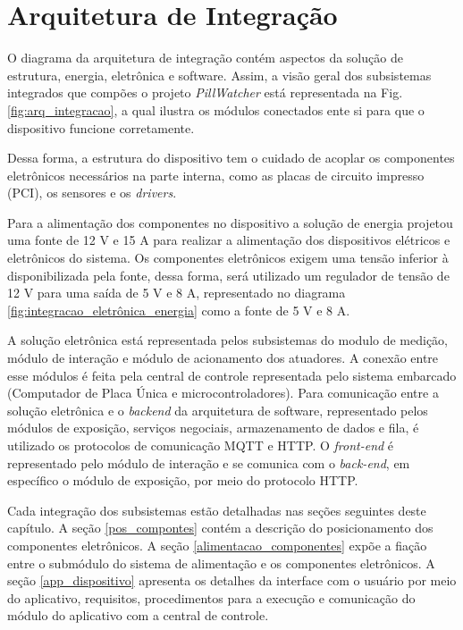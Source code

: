 \chapter[Arquitetura de Integração]{Arquitetura de Integração}

O diagrama da arquitetura de integração contém aspectos da solução de estrutura, energia, eletrônica e software. Assim, a visão geral dos subsistemas integrados que compões o projeto \textit{PillWatcher} está representada na Fig. \ref{fig:arq_integracao}, a qual ilustra os módulos conectados ente si para que o dispositivo funcione corretamente. 

Dessa forma, a estrutura do dispositivo tem o cuidado de acoplar os componentes eletrônicos necessários na parte interna, como as placas de circuito impresso (PCI), os sensores e os \textit{drivers}. 

Para a alimentação dos componentes no dispositivo a solução de energia projetou uma fonte de 12 V e 15 A para realizar a alimentação dos dispositivos elétricos e eletrônicos do sistema. Os componentes eletrônicos exigem uma tensão inferior à disponibilizada pela fonte, dessa forma, será utilizado um regulador de tensão de 12 V para uma saída de 5 V e 8 A, representado no diagrama \ref{fig:integracao_eletrônica_energia} como a fonte de 5 V e 8 A.

A solução eletrônica está representada pelos subsistemas do modulo de medição, módulo de interação e módulo de acionamento dos atuadores. A conexão entre esse módulos é feita pela central de controle representada pelo sistema embarcado (Computador de Placa Única e microcontroladores). Para comunicação entre a solução eletrônica e o \textit{backend} da arquitetura de software, representado pelos módulos de exposição, serviços negociais, armazenamento de dados e fila, é utilizado os protocolos de comunicação MQTT e HTTP. O \textit{front-end} é representado pelo módulo de interação e se comunica com o \textit{back-end}, em específico o módulo de exposição, por meio do protocolo HTTP.

Cada integração dos subsistemas estão detalhadas nas seções seguintes deste capítulo. A seção \ref{pos_compontes} contém a descrição do posicionamento dos componentes eletrônicos. A seção \ref{alimentacao_componentes} expõe a fiação entre o submódulo do sistema de alimentação e os componentes eletrônicos. A seção \ref{app_dispositivo} apresenta os detalhes da interface com o usuário por meio do aplicativo, requisitos, procedimentos para a execução e comunicação do módulo do aplicativo com a central de controle.

